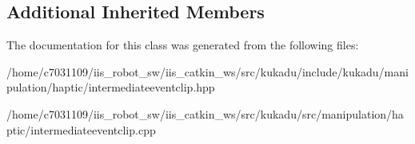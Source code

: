 \subsection*{Additional Inherited Members}


The documentation for this class was generated from the following files\-:\begin{DoxyCompactItemize}
\item 
/home/c7031109/iis\-\_\-robot\-\_\-sw/iis\-\_\-catkin\-\_\-ws/src/kukadu/include/kukadu/manipulation/haptic/intermediateeventclip.\-hpp\item 
/home/c7031109/iis\-\_\-robot\-\_\-sw/iis\-\_\-catkin\-\_\-ws/src/kukadu/src/manipulation/haptic/intermediateeventclip.\-cpp\end{DoxyCompactItemize}
